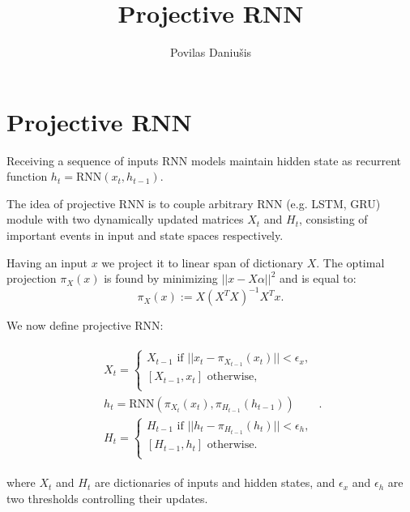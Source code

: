 \documentclass[a4paper,11pt]{article}
\author{Povilas Daniu\v{s}is}
\title{Projective RNN}
\makeatletter
\newcommand{\change@uppercase@math}{%
  \count@=`\A
  \loop
    \mathcode\count@\count@
    \ifnum\count@<`\Z
    \advance\count@\@ne
  \repeat}
\newcommand{\RNN}[1]{
  \mathrm{RNN}(
}
\makeatother
\begin{document}


\maketitle


\section{Projective RNN}
Receiving a sequence of inputs RNN models maintain hidden state as recurrent function $h_{t} = \RNN(x_{t}, h_{t-1})$.

The idea of projective RNN is to couple arbitrary RNN (e.g. LSTM, GRU) module with two dynamically updated matrices $X_{t}$ and $H_{t}$, consisting of important events in input and state spaces respectively.

Having an input $x$ we project it to linear span of dictionary $X$. The optimal projection $\pi_{X}(x)$ is found by minimizing $||x - X\alpha||^{2}$ and is equal to:
$$
\pi_{X}(x) := X(X^{T}X)^{-1}X^{T}x.
$$



We now define projective RNN:

\begin{align}
\begin{split}
X_{t} = \begin{cases}
X_{t-1} \text{  if } ||x_{t} - \pi_{X_{t-1}}(x_{t})|| < \epsilon_{x},\\
[X_{t-1}, x_{t}] \text{  otherwise}, \\
\end{cases}\\
h_{t} = \RNN(\pi_{X_{t}}(x_{t}), \pi_{H_{t-1}}(h_{t-1}))\\
H_{t} = \begin{cases}
H_{t-1} \text{  if } ||h_{t} - \pi_{H_{t-1}}(h_{t})|| < \epsilon_{h}, \\
[H_{t-1}, h_{t}] \text{  otherwise. }\\
\end{cases}
\end{split}.
\end{align}


where $X_{t}$ and $H_{t}$ are dictionaries of inputs and hidden states, and $\epsilon_{x}$ and $\epsilon_{h}$ are two thresholds controlling their updates.

\end{document}
